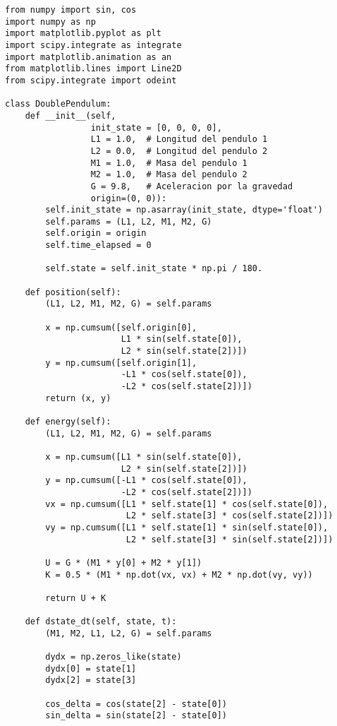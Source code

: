 \documentclass[12pt]{article}
\begin{document}
{\color{RoyalPurple}\begin{verbatim}
from numpy import sin, cos
import numpy as np
import matplotlib.pyplot as plt
import scipy.integrate as integrate
import matplotlib.animation as an
from matplotlib.lines import Line2D
from scipy.integrate import odeint

class DoublePendulum:
    def __init__(self,
                 init_state = [0, 0, 0, 0],
                 L1 = 1.0,  # Longitud del pendulo 1
                 L2 = 0.0,  # Longitud del pendulo 2
                 M1 = 1.0,  # Masa del pendulo 1
                 M2 = 1.0,  # Masa del pendulo 2
                 G = 9.8,   # Aceleracion por la gravedad
                 origin=(0, 0)): 
        self.init_state = np.asarray(init_state, dtype='float')
        self.params = (L1, L2, M1, M2, G)
        self.origin = origin
        self.time_elapsed = 0

        self.state = self.init_state * np.pi / 180.
    
    def position(self):
        (L1, L2, M1, M2, G) = self.params

        x = np.cumsum([self.origin[0],
                       L1 * sin(self.state[0]),
                       L2 * sin(self.state[2])])
        y = np.cumsum([self.origin[1],
                       -L1 * cos(self.state[0]),
                       -L2 * cos(self.state[2])])
        return (x, y)

    def energy(self):
        (L1, L2, M1, M2, G) = self.params

        x = np.cumsum([L1 * sin(self.state[0]),
                       L2 * sin(self.state[2])])
        y = np.cumsum([-L1 * cos(self.state[0]),
                       -L2 * cos(self.state[2])])
        vx = np.cumsum([L1 * self.state[1] * cos(self.state[0]),
                        L2 * self.state[3] * cos(self.state[2])])
        vy = np.cumsum([L1 * self.state[1] * sin(self.state[0]),
                        L2 * self.state[3] * sin(self.state[2])])

        U = G * (M1 * y[0] + M2 * y[1])
        K = 0.5 * (M1 * np.dot(vx, vx) + M2 * np.dot(vy, vy))

        return U + K

    def dstate_dt(self, state, t):
        (M1, M2, L1, L2, G) = self.params

        dydx = np.zeros_like(state)
        dydx[0] = state[1]
        dydx[2] = state[3]

        cos_delta = cos(state[2] - state[0])
        sin_delta = sin(state[2] - state[0])


\end{verbatim}}
\end{document}
